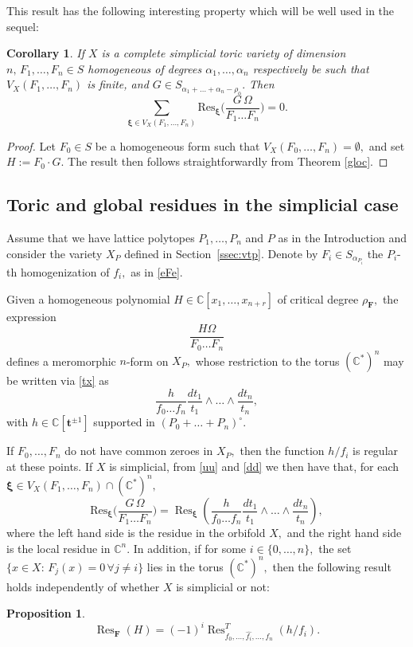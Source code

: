 \documentclass[a4paper,11pt]{amsart}
\newcommand{\Res}{\operatorname{Res}}
\newcommand{\C}{\mathbb{C}}
\newcommand{\bft}{{\boldsymbol{t}}}
\newcommand{\bfF}{{\boldsymbol{F}}}
\newcommand{\bfxi}{{\boldsymbol{\xi}}}
\newcounter{thm}
\numberwithin{thm}{section}
\numberwithin{equation}{section}
\theoremstyle{definition}
\theoremstyle{plain}
\newtheorem{proposition}[thm]{Proposition}
\newtheorem{corollary}[thm]{Corollary}
\begin{document}
This result has the following interesting property which will be well used in the sequel:
 \begin{corollary}\label{ejsi}
If $X$ is a complete simplicial toric variety of dimension $n,\, F_1,\ldots, F_n\in S$ homogeneous of degrees $\alpha_1,\ldots, \alpha_n$ respectively be such that  $V_X(F_1,\ldots, F_n)$ is finite, and $G\in S_{\alpha_1+\ldots+\alpha_n-\rho_0}.$ Then 
$$\sum_{\bfxi\in V_X(F_1,\ldots, F_n)}\mbox{Res}_\bfxi\Big(\frac{G\,\Omega}{F_1\ldots F_n}\Big)=0.
$$
\end{corollary}
\begin{proof}
Let $F_0\in S$ be a homogeneous form such that $V_X(F_0,\ldots, F_n)=\emptyset,$ and set $H:=F_0\cdot G.$ The result then follows straightforwardly from Theorem \ref{gloc}.
\end{proof}



\medskip

\subsection{Toric and global residues in the simplicial case}\label{tgr}
Assume that we have lattice polytopes $P_1,\ldots, P_n$ and $P$ as in the Introduction and consider the variety $X_P$ defined in Section~\ref{ssec:vtp}.
Denote by $F_i\in S_{\alpha_{P_i}}$ the $P_i$-th homogenization of $f_i,$ as in \eqref{eFe}. 

Given a homogeneous polynomial $H\in\C[x_1,\ldots,x_{n+r}]$ of critical degree $\rho_\bfF,$ the expression
\begin{equation}\label{uu}
\frac{H\Omega}{F_0\ldots F_n}
\end{equation}
defines a meromorphic $n$-form on $X_P,$ whose restriction to the torus $(\C^*)^n$ may be written via \eqref{tx} as
\begin{equation}\label{dd}
\frac{h}{f_0\ldots f_n}\frac{dt_1}{t_1}\wedge\ldots\wedge\frac{dt_n}{t_n},
\end{equation}
with $h\in\C[\bft^{\pm1}]$ supported in $(P_0+\ldots+P_n)^\circ.$


If $F_0,\ldots, F_n$ do not have common zeroes in $X_P,$  then the function  $h/f_i$ is regular at these points. If $X$ is simplicial, from \eqref{uu} and \eqref{dd} we then have that, for  each $\bfxi\in V_X(F_1,\ldots, F_n)\cap (\C^*)^n,$ 
\begin{equation}\label{sosi}
\mbox{Res}_\bfxi\Big(\frac{G\,\Omega}{F_1\ldots F_n}\Big)=\Res_\bfxi\left(\frac{h}{f_0\ldots f_n}\frac{dt_1}{t_1}\wedge\ldots\wedge\frac{dt_n}{t_n}\right),
\end{equation}
where the left hand side is the residue in the orbifold $X,$ and the right hand side is the local residue in $\C^n.$
In addition, if for some $i\in\{0,\ldots, n\},$ the set $\{x\in X:\,F_j(x)=0\, \forall j\neq i\}$ lies in the torus $(\C^*)^n,$
then the following result holds independently of whether $X$ is simplicial or not:
\begin{proposition}\cite[Proposition 1.3]{CDS98}\label{locglob}
$$\Res_\bfF(H)=(-1)^i \Res^T_{f_0,\ldots, \widehat{f_i},\ldots, f_n}(h/f_i).$$
\end{proposition}
\end{document}
